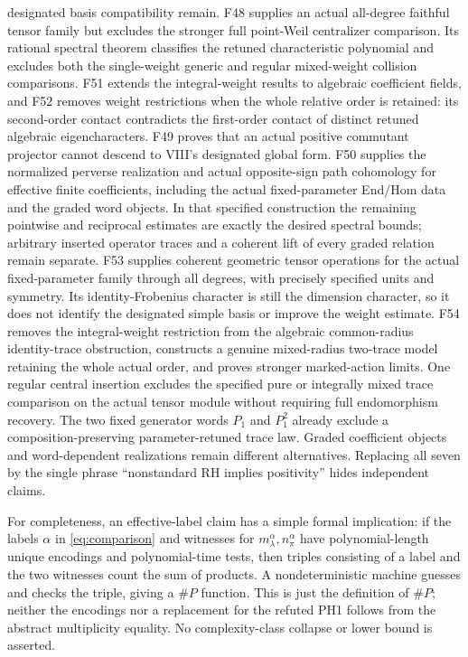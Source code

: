 \documentclass[11pt,a4paper]{article}
\theoremstyle{named}\newtheorem{finding}{Finding}[section]
\theoremstyle{definition}\newtheorem{definition}[finding]{Definition}
\theoremstyle{remark}\newtheorem{remark}[finding]{Remark}
\begin{document}
designated basis compatibility remain. F48 supplies an actual all-degree faithful tensor family but excludes the stronger full point-Weil centralizer comparison. Its rational spectral theorem classifies the retuned characteristic polynomial and excludes both the single-weight generic and regular mixed-weight collision comparisons. F51 extends the integral-weight results to algebraic coefficient fields, and F52 removes weight restrictions when the whole relative order is retained: its second-order contact contradicts the first-order contact of distinct retuned algebraic eigencharacters. F49 proves that an actual positive commutant projector cannot descend to VIII's designated global form. F50 supplies the normalized perverse realization and actual opposite-sign path cohomology for effective finite coefficients, including the actual fixed-parameter End/Hom data and the graded word objects. In that specified construction the remaining pointwise and reciprocal estimates are exactly the desired spectral bounds; arbitrary inserted operator traces and a coherent lift of every graded relation remain separate. F53 supplies coherent geometric tensor operations for the actual fixed-parameter family through all degrees, with precisely specified units and symmetry. Its identity-Frobenius character is still the dimension character, so it does not identify the designated simple basis or improve the weight estimate. F54 removes the integral-weight restriction from the algebraic common-radius identity-trace obstruction, constructs a genuine mixed-radius two-trace model retaining the whole actual order, and proves stronger marked-action limits. One regular central insertion excludes the specified pure or integrally mixed trace comparison on the actual tensor module without requiring full endomorphism recovery. The two fixed generator words $P_1$ and $P_1^2$ already exclude a composition-preserving parameter-retuned trace law. Graded coefficient objects and word-dependent realizations remain different alternatives. Replacing all seven by the single phrase ``nonstandard RH implies positivity'' hides independent claims.

For completeness, an effective-label claim has a simple formal implication: if the labels $\alpha$ in \eqref{eq:comparison} and witnesses for $m_\lambda^\alpha,n_\pi^\alpha$ have polynomial-length unique encodings and polynomial-time tests, then triples consisting of a label and the two witnesses count the sum of products. A nondeterministic machine guesses and checks the triple, giving a \(\#P\) function. This is just the definition of \(\#P\); neither the encodings nor a replacement for the refuted PH1 follows from the abstract multiplicity equality. No complexity-class collapse or lower bound is asserted.
\end{document}
